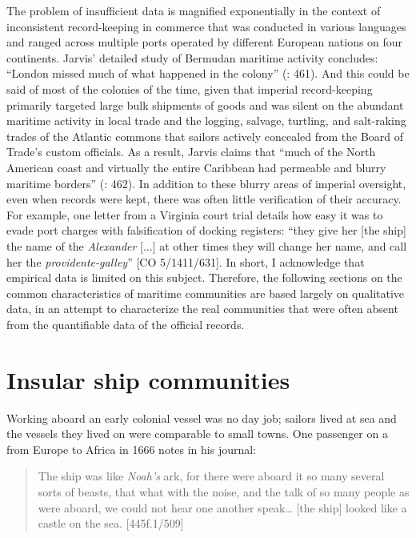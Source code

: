 The problem of insufficient data is magnified exponentially in the context of inconsistent record-keeping in  commerce that was conducted in various languages and ranged across multiple ports operated by different European nations on four continents. Jarvis’ detailed study of Bermudan maritime activity concludes: “London missed much of what happened in the colony” (\citealt{Jarvis2010}: 461). And this could be said of most of the colonies of the time, given that imperial record-keeping primarily targeted large bulk shipments of goods and was silent on the abundant maritime activity in local trade and the logging, salvage, turtling, and salt-raking trades of the Atlantic commons that sailors actively concealed from the Board of Trade’s custom officials. As a result, Jarvis claims that “much of the North American coast and virtually the entire Caribbean had permeable and blurry maritime borders” (\citealt{Jarvis2010}: 462). In addition to these blurry areas of imperial oversight, even when records were kept, there was often little verification of their accuracy. For example, one letter from a Virginia court trial details how easy it was to evade port charges with falsification of docking registers: “they give her [the ship] the name of the \textit{Alexander} [...] at other times they will change her name, and call her the \textit{providente-galley}” [CO 5/1411/631]. In short, I acknowledge that empirical data is limited on this subject.  Therefore, the following sections on the common characteristics of maritime communities are based largely on qualitative data, in an attempt to characterize the real communities that were often absent from the quantifiable data of the official records.

\section{{Insular ship communities}}\label{sec:4.2}

Working aboard an early colonial vessel was no day job; sailors lived at sea and the vessels they lived on were comparable to small towns. One passenger on a  from Europe to Africa in 1666 notes in his journal: 

\begin{quotation}
The ship was like \textit{Noah’s} ark, for there were aboard it so many several sorts of beasts, that what with the noise, and the talk of so many people as were aboard, we could not hear one another speak… [the ship] looked like a castle on the sea. [445f.1/509]
\end{quotation}

